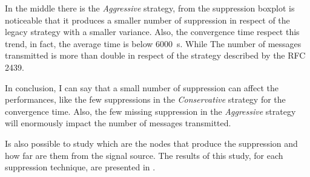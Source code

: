 In the middle there is the \textit{Aggressive} strategy, from the
suppression boxplot is noticeable that it produces a smaller number of suppression in respect
of the legacy strategy with a smaller variance.
Also, the convergence time respect this trend, in fact, the average time is
below \SI{6000}{\second}.
While The number of messages transmitted is more than double in respect
of the strategy described by the \ac{RFC} \num{2439}.

In conclusion, I can say that a small number of suppression can affect the
performances, like the few suppressions in the \textit{Conservative} strategy
for the convergence time.
Also, the few missing suppression in the \textit{Aggressive} strategy will
enormously impact the number of messages transmitted.

Is also possible to study which are the nodes that produce the suppression and how
far are them from the signal source.
The results of this study, for each suppression technique, are presented
in .

